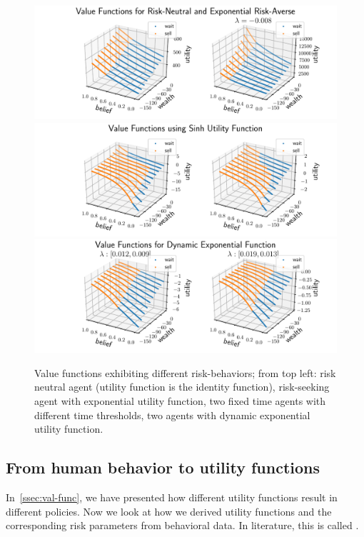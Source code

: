 \begin{figure}[h]
    \centering
    \includegraphics[width=0.99\linewidth]{img/exp_policy.pdf}\\
    \includegraphics[width=0.99\linewidth]{img/sinh_policy.pdf}\\
    \includegraphics[width=0.99\linewidth]{img/dyn_policy.pdf}
    \caption{Value functions exhibiting different risk-behaviors; from top left: risk neutral agent (utility function is the identity function), risk-seeking agent with exponential utility function, two fixed time agents with different time thresholds, two agents with dynamic exponential utility function.}\label{fig:val-func}
\end{figure}

\subsection{From human behavior to utility functions}\label{ssec:human-behavior}

In~\autoref{ssec:val-func}, we have presented how different utility functions result in different policies.
Now we look at how we derived utility functions and the corresponding risk parameters from behavioral data.
In literature, this is called  \cite{Abbeel2010}.

